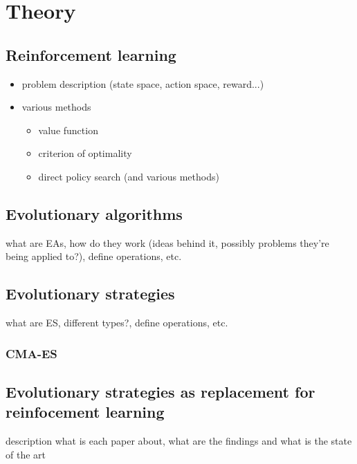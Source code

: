 \chapter{Theory}
\label{chap:theory}

\section{Reinforcement learning}
\label{sec:reinf}
\begin{itemize}
    \item problem description (state space, action space, reward...)
    \item various methods \begin{itemize}
        \item value function
        \item criterion of optimality
        \item direct policy search (and various methods)
    \end{itemize}
\end{itemize}
\section{Evolutionary algorithms}
\label{sec:ea}
what are EAs, how do they work (ideas behind it, possibly problems they're being applied to?), define operations, etc.
\section{Evolutionary strategies}
\label{sec:es}
what are ES, different types?, define operations, etc.
\subsection{CMA-ES}
\label{subsec:cma-es}

\section{Evolutionary strategies as replacement for reinfocement learning}
\label{sec:es-reinf}
description what is each paper about, what are the findings and what is the state of the art

